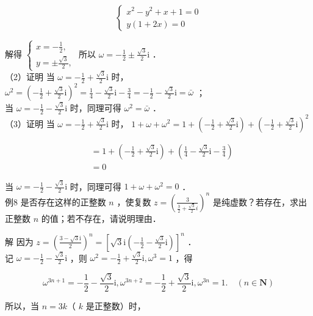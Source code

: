 \documentclass[10pt]{article}
\begin{document}
\[
\left\{\begin{array}{l}
x^{2}-y^{2}+x+1=0 \\
y(1+2 x)=0
\end{array}\right.
\]

解得 \(\left\{\begin{array}{l}x=-\frac{1}{2}, \\ y= \pm \frac{\sqrt{3}}{2},\end{array}\right.\) 所以 \(\omega=-\frac{1}{2} \pm \frac{\sqrt{3}}{2} \mathrm{i}\) ．\\
（2）证明 当 \(\omega=-\frac{1}{2}+\frac{\sqrt{3}}{2} \mathrm{i}\) 时，\(\omega^{2}=\left(-\frac{1}{2}+\frac{\sqrt{3}}{2} \mathrm{i}\right)^{2}=\frac{1}{4}-\frac{\sqrt{3}}{2} \mathrm{i}-\frac{3}{4}=-\frac{1}{2}-\frac{\sqrt{3}}{2} \mathrm{i}=\bar{\omega}\) ；\\
当 \(\omega=-\frac{1}{2}-\frac{\sqrt{3}}{2} \mathrm{i}\) 时，同理可得 \(\omega^{2}=\bar{\omega}\) ．\\
（3）证明 当 \(\omega=-\frac{1}{2}+\frac{\sqrt{3}}{2} \mathrm{i}\) 时， \(1+\omega+\omega^{2}=1+\left(-\frac{1}{2}+\frac{\sqrt{3}}{2} \mathrm{i}\right)+\left(-\frac{1}{2}+\frac{\sqrt{3}}{2} \mathrm{i}\right)^{2}\)

\[
\begin{aligned}
& =1+\left(-\frac{1}{2}+\frac{\sqrt{3}}{2} \mathrm{i}\right)+\left(\frac{1}{4}-\frac{\sqrt{3}}{2} \mathrm{i}-\frac{3}{4}\right) \\
& =0
\end{aligned}
\]

当 \(\omega=-\frac{1}{2}-\frac{\sqrt{3}}{2} \mathrm{i}\) 时，同理可得 \(1+\omega+\omega^{2}=0\) ．\\
例8 是否存在这样的正整数 \(n\) ，使复数 \(z=\left(\frac{3}{\frac{3}{2}+\frac{\sqrt{3}}{2} i}\right)^{n}\) 是纯虚数？若存在，求出正整数 \(n\) 的值；若不存在，请说明理由．

解 因为 \(z=\left(\frac{3-\sqrt{3} \mathrm{i}}{2}\right)^{n}=\left[\sqrt{3} \mathrm{i}\left(-\frac{1}{2}-\frac{\sqrt{3}}{2} \mathrm{i}\right)\right]^{n}\) ．\\
记 \(\omega=-\frac{1}{2}-\frac{\sqrt{3}}{2} \mathrm{i}\) ，则 \(\omega^{2}=-\frac{1}{2}+\frac{\sqrt{3}}{2} \mathrm{i}, \omega^{3}=1\) ，得

\[
\omega^{3 n+1}=-\frac{1}{2}-\frac{\sqrt{3}}{2} \mathrm{i}, \omega^{3 n+2}=-\frac{1}{2}+\frac{\sqrt{3}}{2} \mathrm{i}, \omega^{3 n}=1 . \quad(n \in \mathbf{N})
\]

所以，当 \(n=3 k\)（ \(k\) 是正整数）时，
\end{document}
